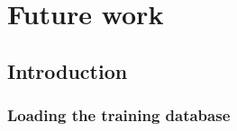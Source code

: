\chapter{Future work}
\label{chap:future}

\section{Introduction}




\subsection{Loading the training database}  

